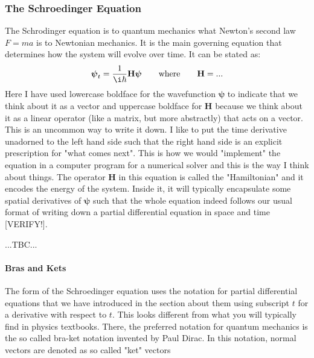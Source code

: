 
\subsubsection{The Schroedinger Equation}
The  Schrodinger equation is to quantum mechanics what Newton's second law $F = m a$ is to Newtonian mechanics. It is the main governing equation that determines how the system will evolve over time. It can be stated as:
\begin{equation}
 \boldsymbol{\psi}_{t} = \frac{1}{\i \hbar} \mathbf{H} \boldsymbol{\psi}
 \qquad \text{where} \qquad
 \mathbf{H} = ...
\end{equation}
Here I have used lowercase boldface for the wavefunction $\boldsymbol{\psi}$ to indicate that we think about it as a vector and uppercase boldface for $\mathbf{H}$ because we think about it as a linear operator (like a matrix, but more abstractly) that acts on a vector. This is an uncommon way to write it down. I like to put the time derivative unadorned to the left hand side such that the right hand side is an explicit prescription for "what comes next". This is how we would "implement" the equation in a computer program for a numerical solver and this is the way I think about things. The operator $\mathbf{H}$ in this equation is called the "Hamiltonian" and it encodes the energy of the system. Inside it, it will typically encapsulate some spatial derivatives of $\boldsymbol{\psi}$ such that the whole equation indeed follows our usual format of writing down a partial differential equation in space and time [VERIFY!].

...TBC...


% 

\paragraph{Bras and Kets}
The form of the Schroedinger equation uses the notation for partial differential equations that we have introduced in the section about them using subscript $t$ for a derivative with respect to $t$. This looks different from what you will typically find in physics textbooks. There, the preferred notation for quantum mechanics is the so called bra-ket notation invented by Paul Dirac. In this notation, normal vectors are denoted as so called "ket" vectors

